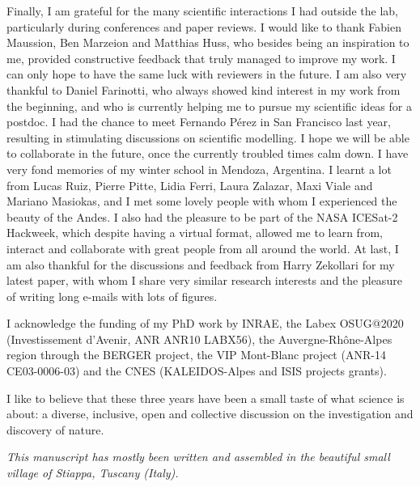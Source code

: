 Finally, I am grateful for the many scientific interactions I had outside the lab, particularly during conferences and paper reviews. I would like to thank Fabien Maussion, Ben Marzeion and Matthias Huss, who besides being an inspiration to me, provided constructive feedback that truly managed to improve my work. I can only hope to have the same luck with reviewers in the future. I am also very thankful to Daniel Farinotti, who always showed kind interest in my work from the beginning, and who is currently helping me to pursue my scientific ideas for a postdoc. I had the chance to meet Fernando Pérez in San Francisco last year, resulting in stimulating discussions on scientific modelling. I hope we will be able to collaborate in the future, once the currently troubled times calm down. I have very fond memories of my winter school in Mendoza, Argentina. I learnt a lot from Lucas Ruiz, Pierre Pitte, Lidia Ferri, Laura Zalazar, Maxi Viale and Mariano Masiokas, and I met some lovely people with whom I experienced the beauty of the Andes. I also had the pleasure to be part of the NASA ICESat-2 Hackweek, which despite having a virtual format, allowed me to learn from, interact and collaborate with great people from all around the world. At last, I am also thankful for the discussions and feedback from Harry Zekollari for my latest paper, with whom I share very similar research interests and the pleasure of writing long e-mails with lots of figures.

I acknowledge the funding of my PhD work by INRAE, the Labex OSUG@2020 (Investissement d'Avenir, ANR ANR10 LABX56), the Auvergne-Rhône-Alpes region through the BERGER project, the VIP Mont-Blanc project (ANR-14 CE03-0006-03) and the CNES (KALEIDOS-Alpes and ISIS projects grants).

I like to believe that these three years have been a small taste of what science is about: a diverse, inclusive, open and collective discussion on the investigation and discovery of nature. 

\bigskip
\bigskip
\bigskip
\bigskip

\begin{flushright}
\begin{small}
\textit{This manuscript has mostly been written and assembled in the beautiful small village of Stiappa, Tuscany (Italy).}
\end{small}
\end{flushright}

